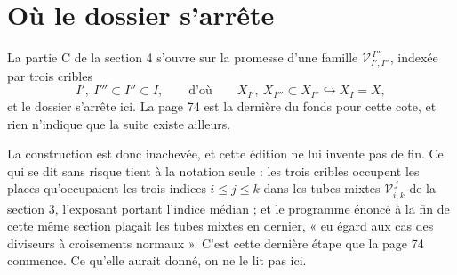 \documentclass[11pt,a4paper]{article}
\begin{document}
\section*{Où le dossier s'arrête}

La partie C de la section 4 s'ouvre sur la promesse d'une famille
$\mathcal{V}^{\,I'''}_{I',I''}$, indexée par trois cribles
\[
  I',\ I''' \subset I'' \subset I,
  \qquad\text{d'où}\qquad
  X_{I'},\ X_{I'''} \subset X_{I''} \hookrightarrow X_{I} = X,
\]
et le dossier s'arrête ici. La page 74 est la dernière du fonds pour cette cote,
et rien n'indique que la suite existe ailleurs.

La construction est donc inachevée, et cette édition ne lui invente pas de fin.
Ce qui se dit sans risque tient à la notation seule : les trois cribles occupent
les places qu'occupaient les trois indices $i \leq j \leq k$ dans les tubes
mixtes $\mathcal{V}^{\,j}_{i,k}$ de la section 3, l'exposant portant l'indice
médian ; et le programme énoncé à la fin de cette même section plaçait les tubes
mixtes en dernier, « eu égard aux cas des diviseurs à croisements normaux ».
C'est cette dernière étape que la page 74 commence. Ce qu'elle aurait donné, on
ne le lit pas ici.
\end{document}
